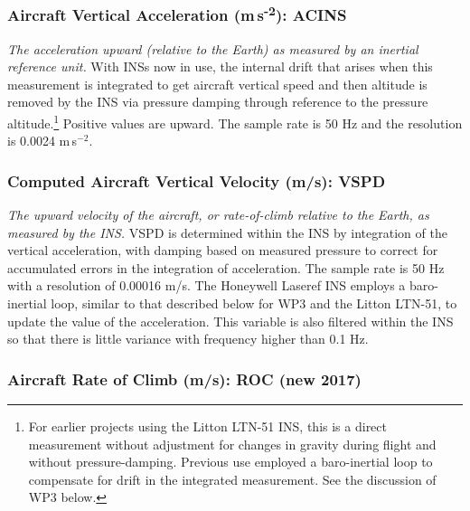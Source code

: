 \documentclass[
  english,
]{book}
\begin{document}
\hypertarget{ACINS}{%
\subsubsection*{\texorpdfstring{Aircraft Vertical Acceleration
(m s\textsuperscript{-2}):
ACINS}{Aircraft Vertical Acceleration (m s-2): ACINS}}\label{ACINS}}

\emph{The acceleration upward (relative to the Earth) as measured by an
inertial reference unit.} With INSs now in use, the internal drift that
arises when this measurement is integrated to get aircraft vertical
speed and then altitude is removed by the INS via pressure damping
through reference to the pressure altitude.\footnote{For earlier
  projects using the Litton LTN-51 INS, this is a direct measurement
  without adjustment for changes in gravity during flight and without
  pressure-damping. Previous use employed a baro-inertial loop to
  compensate for drift in the integrated measurement. See the discussion
  of WP3 below.} Positive values are upward. The sample rate is 50 Hz
and the resolution is 0.0024 m s\(^{-2}\).

\hypertarget{vspd}{%
\subsubsection*{Computed Aircraft Vertical Velocity (m/s):
VSPD}\label{vspd}}

\emph{The upward velocity of the aircraft, or rate-of-climb relative to
the Earth, as measured by the INS.} VSPD is determined within the INS by
integration of the vertical acceleration, with damping based on measured
pressure to correct for accumulated errors in the integration of
acceleration. The sample rate is 50 Hz with a resolution of 0.00016 m/s.
The Honeywell Laseref INS employs a baro-inertial loop, similar to that
described below for WP3 and the Litton LTN-51, to update the value of
the acceleration. This variable is also filtered within the INS so that
there is little variance with frequency higher than 0.1 Hz.

\hypertarget{roc}{%
\subsubsection*{Aircraft Rate of Climb (m/s): ROC (new
2017)}\label{roc}}
\end{document}
